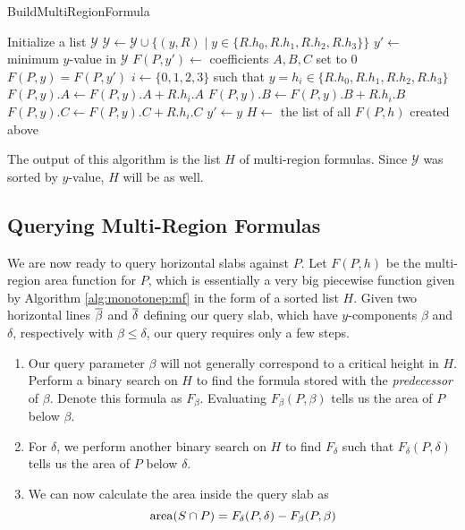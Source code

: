 \begin{algorithm}
\LinesNumbered
\DontPrintSemicolon
\caption{BuildMultiRegionFormula}
\label{alg:monotonep:mf}
\BlankLine
Initialize a list $\mathcal{Y}$\;
{
$\mathcal{Y} \gets \mathcal{Y} \cup \{ (y,R) \;|\; y \in \{R.h_0, R.h_1, R.h_2, R.h_3\}\}$\;
}
\;
\BlankLine
$y' \gets $ minimum $y$-value in $\mathcal{Y}$\;
$F(P, y') \gets $ coefficients $A,B,C$ set to 0\;
\BlankLine
{}
{
$F(P, y) = F(P, y')$\;
$i \gets \{0,1,2,3\}$ such that $y = h_i \in \{R.h_0, R.h_1, R.h_2, R.h_3\}$\;
$F(P,y).A \gets F(P,y).A + R.h_i.A$\;
$F(P,y).B \gets F(P,y).B + R.h_i.B$\;
$F(P,y).C \gets F(P,y).C + R.h_i.C$\;
\BlankLine
$y' \gets y$\;
}
\BlankLine
$H \gets $ the list of all $F(P, h)$ created above\;
\end{algorithm}

The output of this algorithm is the list $H$ of multi-region formulas. Since $\mathcal{Y}$ was sorted by $y$-value, $H$ will be as well.


\subsection{Querying Multi-Region Formulas}
\label{:monotonep:query-mf}

We are now ready to query horizontal slabs against $P$. 
Let $F(P,h)$ be the multi-region area function for $P$, which is essentially a very big piecewise function given by Algorithm \ref{alg:monotonep:mf} in the form of a sorted list $H$.
Given two horizontal lines $\overline{\beta}$ and $\overline{\delta}$ defining our query slab, which have $y$-components $\beta$ and $\delta$, respectively with $\beta \leq \delta$, our query requires only a few steps.

\begin{enumerate}
\item Our query parameter $\beta$ will not generally correspond to a critical height in $H$.
Perform a binary search on $H$ to find the formula stored with the \emph{predecessor} of $\beta$.
Denote this formula as $F_\beta$.
Evaluating $F_\beta(P, \beta)$ tells us the area of $P$ below $\beta$.

\item For $\delta$, we perform another binary search on $H$ to find $F_\delta$ such that $F_\delta(P, \delta)$ tells us the area of $P$ below $\delta$.

\item We can now calculate the area inside the query slab as
\[ 
\operatorname{area}\!\left(S \cap P\right) = F_\delta(P, \delta) - F_\beta(P, \beta)
\]

\end{enumerate}


